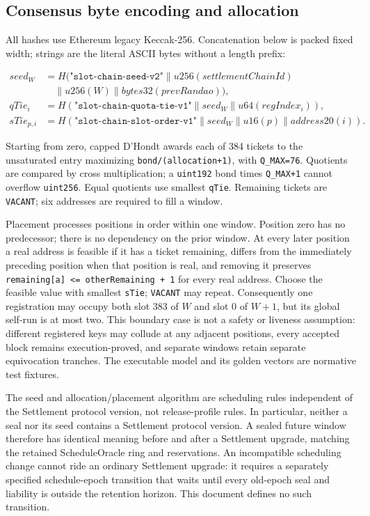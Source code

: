 \documentclass[a4paper,11pt]{article}
\newcommand{\code}[1]{\nolinkurl{#1}}
\begin{document}
\subsection{Consensus byte encoding and allocation}

All hashes use Ethereum legacy Keccak-256.  Concatenation below is packed fixed
width; strings are the literal ASCII bytes without a length prefix:

\begin{align*}
seed_W &= H(\texttt{"slot-chain-seed-v2"} \| u256(settlementChainId) \\
       &\quad \| u256(W) \| bytes32(prevRandao)),\\
qTie_i &= H(\texttt{"slot-chain-quota-tie-v1"} \| seed_W \| u64(regIndex_i)),\\
sTie_{p,i} &= H(\texttt{"slot-chain-slot-order-v1"} \| seed_W
                   \| u16(p) \| address20(i)).
\end{align*}

Starting from zero, capped D'Hondt awards each of 384 tickets to the unsaturated
entry maximizing \code{bond/(allocation+1)}, with
\code{Q_MAX=76}.  Quotients are compared by cross multiplication; a
\code{uint192} bond times \code{Q_MAX+1} cannot overflow \code{uint256}.  Equal
quotients use smallest \code{qTie}.  Remaining tickets are \code{VACANT}; six
addresses are required to fill a window.

Placement processes positions in order within one window.  Position zero has
no predecessor; there is no dependency on the prior window.  At every later
position a real address is feasible if it has a ticket remaining, differs from
the immediately preceding position when that position is real, and removing it
preserves \code{remaining[a] <= otherRemaining + 1} for every real address.
Choose the feasible value with smallest \code{sTie}; \code{VACANT} may repeat.
Consequently one registration may occupy both slot 383 of $W$ and slot 0 of
$W+1$, but its global self-run is at most two.  This boundary case is not a
safety or liveness assumption: different registered keys may collude at any
adjacent positions, every accepted block remains execution-proved, and separate
windows retain separate equivocation tranches.  The executable model and its
golden vectors are normative test fixtures.

The seed and allocation/placement algorithm are scheduling rules independent
of the Settlement protocol version, not release-profile rules.  In particular,
neither a seal nor its seed contains a Settlement protocol version.  A sealed
future window therefore has identical meaning before and after a Settlement
upgrade, matching the retained ScheduleOracle ring and reservations.  An
incompatible scheduling change cannot ride an ordinary Settlement upgrade: it
requires a separately specified schedule-epoch transition that waits until
every old-epoch seal and liability is outside the retention horizon.  This
document defines no such transition.
\end{document}
